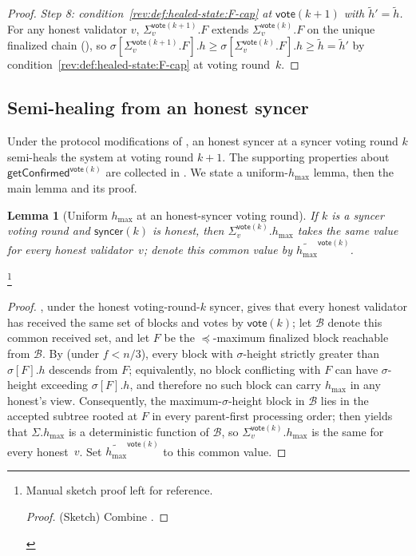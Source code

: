 \ifx\litemode\undefined\documentclass{article}\fi
\newcommand{\hmax}{\ensuremath{h_{\max}}\xspace}
\newcommand{\vote}{\ensuremath{\mathsf{vote}}}
\newcommand{\comm}[1]{\ensuremath{\widetilde{#1}}}
\newcommand{\syncer}{\textsf{syncer}\xspace}
\newcommand{\getConfirmed}{\textsf{getConfirmed}\xspace}
\theoremstyle{plain}
\newtheorem{lemma}{Lemma}
\theoremstyle{definition}
\theoremstyle{remark}
\begin{document}
\begin{proof}
\emph{Step 8: condition~\ref{rev:def:healed-state:F-cap} at $\vote(k{+}1)$ with $\comm{h}' = \comm{h}$.}
For any honest validator $v$, $\Sigma_v^{\vote(k+1)}.F$ extends $\Sigma_v^{\vote(k)}.F$ on the unique finalized chain (), so $\sigma[\Sigma_v^{\vote(k+1)}.F].h \geq \sigma[\Sigma_v^{\vote(k)}.F].h \geq \comm{h} = \comm{h}'$ by condition~\ref{rev:def:healed-state:F-cap} at voting round~$k$.
\end{proof}

\subsection{Semi-healing from an honest syncer}\label{sec:healing-sparse}

Under the protocol modifications of , an honest syncer at a syncer voting round $k$ semi-heals the system at voting round $k+1$. The supporting properties about $\getConfirmed^{\vote(k)}$ are collected in . We state a uniform-$\hmax$ lemma, then the main lemma and its proof.

\begin{lemma}[Uniform $\hmax$ at an honest-syncer voting round]\label{lem:uniform-hmax-at-syncer}
If $k$ is a syncer voting round and $\syncer(k)$ is honest, then $\Sigma_v^{\vote(k)}.\hmax$ takes the same value for every honest validator~$v$; denote this common value by $\comm{\hmax}^{\vote(k)}$.
\end{lemma}

\iffull
\footnote{
Manual sketch proof left for reference.
\begin{proof}(Sketch)
  Combine .
\end{proof}}
\fi

\begin{proof}
  , under the honest voting-round-$k$ syncer, gives that every honest validator has received the same set of blocks and votes by $\vote(k)$; let $\mathcal{B}$ denote this common received set, and let $F$ be the $\preceq$-maximum finalized block reachable from $\mathcal{B}$. By  (under $f < n/3$), every block with $\sigma$-height strictly greater than $\sigma[F].h$ descends from $F$; equivalently, no block conflicting with $F$ can have $\sigma$-height exceeding $\sigma[F].h$, and therefore no such block can carry $\hmax$ in any honest's view. Consequently, the maximum-$\sigma$-height block in $\mathcal{B}$ lies in the accepted subtree rooted at $F$ in every parent-first processing order;  then yields that $\Sigma.\hmax$ is a deterministic function of $\mathcal{B}$, so $\Sigma_v^{\vote(k)}.\hmax$ is the same for every honest~$v$. Set $\comm{\hmax}^{\vote(k)}$ to this common value.  
\end{proof}
\end{document}
